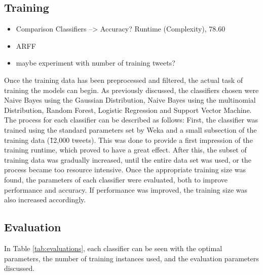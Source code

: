 \subsection{Training}
\begin{itemize}
    \item Comparison Classifiers --> Accuracy? Runtime (Complexity), 78.60
    \item ARFF
    \item maybe experiment with number of training tweets?
    \end{itemize}

Once the training data has been preprocessed and filtered, the actual task of training the models can begin. As previously discussed, the classifiers chosen were Naive Bayes using the Gaussian Distribution, Naive Bayes using the multinomial Distribution, Random Forest, Logistic Regression and Support Vector Machine. The process for each classifier can be described as follows: First, the classifier was trained using the standard parameters set by Weka and a small subsection of the training data (\~12,000 tweets). This was done to provide a first impression of the training runtime, which proved to have a great effect. After this, the subset of training data was gradually increased, until the entire data set was used, or the process became too resource intensive. Once the appropriate training size was found, the parameters of each classifier were evaluated, both to improve performance and accuracy. If performance was improved, the training size was also increased accordingly.

\subsection{Evaluation}
In Table \ref{tab:evaluations}, each classifier can be seen with the optimal parameters, the number of training instances used, and the evaluation parameters discussed.

